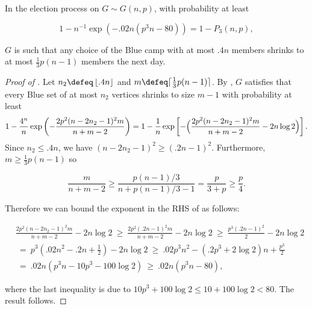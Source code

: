 \documentclass{toc}
\begin{document}
			
			
			\begin{lemma} \label{prop:uni-linear-advantage}
				In the election process on $G\sim G(n, p)$,
				with probability at least
				\begin{linenomath}\begin{equation*}
						1 - n^{-1}\exp\left(-.02n(p^3n - 80)\right) = 1 - P_3(n, p),
				\end{equation*}\end{linenomath}
				$G$ is such that any choice of the Blue camp with at most $.4n$ members shrinks to at most $\frac{1}{3}p(n - 1)$ members the next day.
			\end{lemma}
			
			\begin{proof}[Proof of ]
				Let $n_2 \defeq \left\lfloor .4n \right\rfloor$ and $m \defeq \lceil \frac{1}{3}p(n-1) \rceil$.
				By , $G$ satisfies that every Blue set of at most $n_2$ vertices shrinks to size $m - 1$ with probability at least
				\begin{equation} \label{eq:uni-linear-advantage-temp1}
					\begin{aligned}
						1 - \frac{4^n}{n} \exp\left(-\frac{2p^2(n - 2n_2 - 1)^2m}{n + m - 2} \right)
						= 1 - \frac{1}{n} \exp\left[-\Bigl(\frac{2p^2(n - 2n_2 - 1)^2m}{n + m - 2} - 2n \log 2\Bigr)\right].
					\end{aligned}
				\end{equation}
				Since $n_2\le .4n$, we have $(n - 2n_2 - 1)^2 \ge (.2n - 1)^2$.
				Furthermore,  $m\ge \frac{1}{3}p(n-1)$ so
				\begin{linenomath}\begin{equation*}
						\frac{m}{n + m - 2}
						\ge \frac{p(n-1)/3}{n + p(n-1)/3 - 1} = \frac{p}{3 + p} \ge \frac{p}{4}.
				\end{equation*}\end{linenomath}
				Therefore we can bound the exponent in the RHS of  as follows:
				\begin{linenomath}\begin{equation*}
						\begin{aligned}
							& \frac{2p^2(n - 2n_2 - 1)^2m}{n + m - 2} - 2n \log 2
							~\ge~  \frac{2p^2(.2n - 1)^2 m}{n + m - 2} - 2n \log 2
							~\ge~ \frac{p^3(.2n - 1)^2}{2} - 2n \log 2 \\
							& ~=~ p^3\left(.02n^2 - .2n + \frac{1}{2}\right) - 2n \log 2
							~\ge~ .02 p^3 n^2 - (.2p^3 + 2\log 2)n + \frac{p^3}{2} \\
							& ~=~ .02 n (p^3n - 10p^3 - 100\log 2)
							~\ge~ .02 n (p^3n - 80),
						\end{aligned}
				\end{equation*}\end{linenomath}
				where the last inequality is due to $10p^3 + 100\log 2 \le 10 + 100\log 2 < 80$.
				The result follows.
			\end{proof}
			
\end{document}
